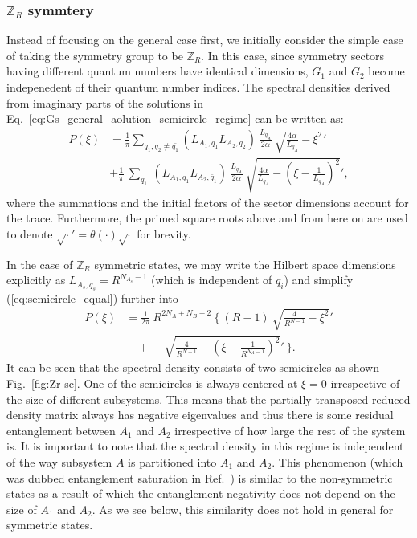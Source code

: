 \documentclass[aps,pra,reprint,superscriptaddress,twocolumn,notitlepage]{revtex4-1}
\newcommand{\Z}{\mathbb{Z}}
\numberwithin{equation}{section}
\begin{document}
\subsubsection{$\mathbb{Z}_R$ symmtery}
Instead of focusing on the general case first, we initially consider the simple case of taking the symmetry group to be $\mathbb{Z}_R$.
In this case, since symmetry sectors having different quantum numbers have identical dimensions, $G_1$ and $G_2$ become indepenedent of their quantum number indices. The spectral densities derived from imaginary parts of the solutions in Eq.~\eqref{eq:Gs_general_aolution_semicircle_regime} can be written as:
\begin{equation}
\label{eq:semicircle_equal}
\begin{aligned}
    P(\xi) &= \frac{1}{\pi}\sum_{q_1 , q_2\neq\bar{q_1}} \left(L_{A_1,q_1} L_{A_2,q_2}\right) \ \frac{L_{q_A} }{2\alpha} \  \sqrt{\frac{4\alpha}{L_{q_A}} - \xi^2 }'  \\
    &+ \frac{1}{\pi}  \ \sum_{q_1} \ \left(L_{A_1,q_1} L_{A_2,\bar{q}_1}\right)  \ \frac{L_{q_A}}{2\alpha} \ \sqrt{ \frac{4\alpha}{L_{q_A}} - \left(\xi-\frac{1}{L_{q_A}} \right)^2 }',
\end{aligned}    
\end{equation}
where the summations and the initial factors of the sector dimensions account for the trace. Furthermore, the primed square roots above and from here on are used to denote $\sqrt{\cdot}'=\theta(\cdot)\sqrt{\cdot}$ for brevity. 


In the case of $\Z_R$ symmetric states, we may write the Hilbert space dimensions explicitly as $L_{A_s,q_s}=R^{N_{A_s}-1}$ (which is independent of $q_i$) and  simplify (\ref{eq:semicircle_equal}) further into 
\begin{equation}\label{eq:spectral_ZR_projected}
\begin{aligned}
    P(\xi) &= \frac{1}{2\pi} \  R^{2N_A+N_B-2}  \ \Bigg\{  \ (R-1) \ \sqrt{ \frac{4}{R^{N-1}} - \xi^2 }' 
    \\
    & \quad +  \quad   \ 
    \sqrt{ \frac{4}{R^{N-1}} - \left( \xi - \frac{1}{R^{N_A-1}} \right)^2 }' \  \Bigg\}.
\end{aligned}    
\end{equation}
It can be seen that the spectral density consists of two semicircles as shown Fig.~\ref{fig:Zr-sc}. One of the semicircles is always centered at $\xi=0$ irrespective of the size of different subsystems. This means that the partially transposed reduced density matrix always has negative eigenvalues and thus there is some residual entanglement between $A_1$ and $A_2$ irrespective of how large the rest of the system is. It is important to note that the spectral density in this regime is independent of the way subsystem $A$ is partitioned into $A_1$ and $A_2$. This phenomenon (which was dubbed entanglement saturation in Ref.~\cite{Shapourian2021}) is similar to the non-symmetric states as a result of which the entanglement negativity does not depend on the size of $A_1$ and $A_2$. As we see below, this similarity does not hold in general for symmetric states.
\end{document}
